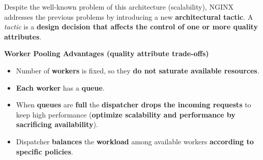 \noindent
Despite the well-known problem of this architecture (scalability), NGINX addresses the previous problems by introducing a new \textbf{architectural tactic}. A \emph{tactic} is a \textbf{design decision that affects the control of one or more quality attributes}.

\begin{flushleft}
    \textcolor{Green3}{\textbf{ Worker Pooling Advantages (quality attribute trade-offs)}}
\end{flushleft}
\begin{itemize}
    \item Number of \textbf{workers} is fixed, so they \textbf{do not saturate available resources}.
    
    \item \textbf{Each worker} has a \textbf{queue}.
    
    \item When \textbf{queues} are \textbf{full} the \textbf{dispatcher drops the incoming requests} to keep high performance (\textbf{optimize scalability and performance by sacrificing availability}).
    
    \item Dispatcher \textbf{balances} the \textbf{workload} among available workers \textbf{according to specific policies}.
\end{itemize}